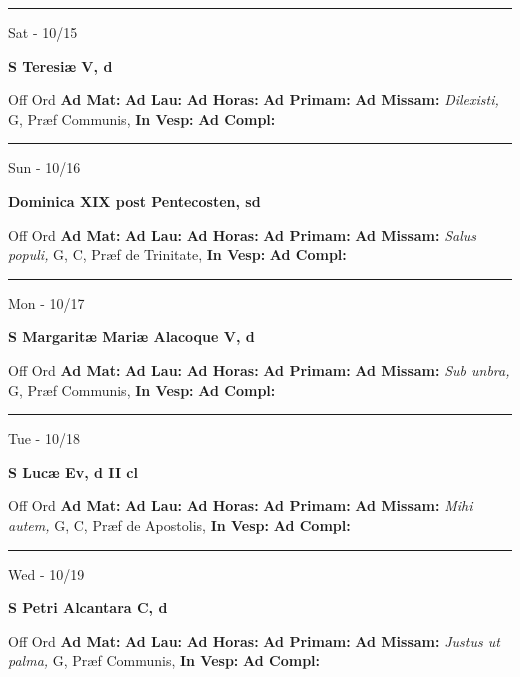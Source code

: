 \documentclass[letterpaper, 10pt]{article}
\begin{document}
\hrule
\begin{center}
Sat - 10/15
\end{center}\textbf{ \large S Teresiæ V, \textnormal{\normalsize d}}
\begin{justify}
Off Ord
\textbf{Ad Mat: }
\textbf{Ad Lau: }
\textbf{Ad Horas: }
\textbf{Ad Primam: }
\textbf{Ad Missam:} \textit{Dilexisti, } G, Præf Communis, 
\textbf{In Vesp: }
\textbf{Ad Compl: }\end{justify}



\hrule
\begin{center}
Sun - 10/16
\end{center}\textbf{ \large Dominica XIX post Pentecosten, \textnormal{\normalsize sd}}
\begin{justify}
Off Ord
\textbf{Ad Mat: }
\textbf{Ad Lau: }
\textbf{Ad Horas: }
\textbf{Ad Primam: }
\textbf{Ad Missam:} \textit{Salus populi, } G, C, Præf de Trinitate, 
\textbf{In Vesp: }
\textbf{Ad Compl: }\end{justify}



\hrule
\begin{center}
Mon - 10/17
\end{center}\textbf{ \large S Margaritæ Mariæ Alacoque V, \textnormal{\normalsize d}}
\begin{justify}
Off Ord
\textbf{Ad Mat: }
\textbf{Ad Lau: }
\textbf{Ad Horas: }
\textbf{Ad Primam: }
\textbf{Ad Missam:} \textit{Sub unbra, } G, Præf Communis, 
\textbf{In Vesp: }
\textbf{Ad Compl: }\end{justify}



\hrule
\begin{center}
Tue - 10/18
\end{center}\textbf{ \large S Lucæ Ev, \textnormal{\normalsize d II cl}}
\begin{justify}
Off Ord
\textbf{Ad Mat: }
\textbf{Ad Lau: }
\textbf{Ad Horas: }
\textbf{Ad Primam: }
\textbf{Ad Missam:} \textit{Mihi autem, } G, C, Præf de Apostolis, 
\textbf{In Vesp: }
\textbf{Ad Compl: }\end{justify}



\hrule
\begin{center}
Wed - 10/19
\end{center}\textbf{ \large S Petri Alcantara C, \textnormal{\normalsize d}}
\begin{justify}
Off Ord
\textbf{Ad Mat: }
\textbf{Ad Lau: }
\textbf{Ad Horas: }
\textbf{Ad Primam: }
\textbf{Ad Missam:} \textit{Justus ut palma, } G, Præf Communis, 
\textbf{In Vesp: }
\textbf{Ad Compl: }\end{justify}
\end{document}
